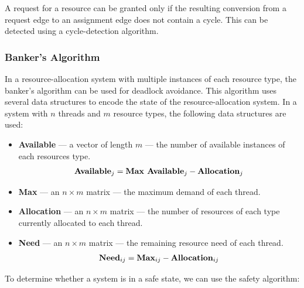 \documentclass{article}
\begin{document}
A request for a resource can be granted only if the resulting
conversion from a request edge to an assignment edge does not contain a
cycle. This can be detected using a cycle-detection algorithm.
\subsubsection{Banker's Algorithm}
In a resource-allocation system with multiple instances of each
resource type, the banker's algorithm can be used for deadlock
avoidance. This algorithm uses several data structures to encode the
state of the resource-allocation system. In a system with \(n\) threads
and \(m\) resource types, the following data structures are used:
\begin{itemize}
    \item \textbf{Available} --- a vector of length \(m\) --- the number of available instances of each resources type.
          \begin{equation*}
              \text{\textbf{Available}}_j = \text{\textbf{Max Available}}_j - \text{\textbf{Allocation}}_j
          \end{equation*}
    \item \textbf{Max} --- an \(n \times m\) matrix --- the maximum
          demand of each thread.
    \item \textbf{Allocation} --- an \(n \times m\) matrix --- the
          number of resources of each type currently allocated to each
          thread.
    \item \textbf{Need} --- an \(n \times m\) matrix --- the remaining
          resource need of each thread.
          \begin{equation*}
              \text{\textbf{Need}}_{ij} = \text{\textbf{Max}}_{ij} - \text{\textbf{Allocation}}_{ij}
          \end{equation*}
\end{itemize}
To determine whether a system is in a safe state, we can use the safety
algorithm:
\end{document}
